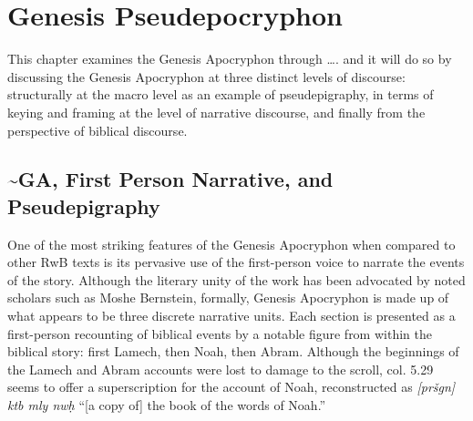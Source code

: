 \hypertarget{genesis-pseudepocryphon}{%
\chapter{Genesis Pseudepocryphon}\label{genesis-pseudepocryphon}}

This chapter examines the Genesis Apocryphon through \ldots{}. and it
will do so by discussing the Genesis Apocryphon at three distinct levels
of discourse: structurally at the macro level as an example of
pseudepigraphy, in terms of keying and framing at the level of narrative
discourse, and finally from the perspective of biblical discourse.

\hypertarget{ga-first-person-narrative-and-psy}{%
\section{\textasciitilde{}GA, First Person Narrative, and
Pseudepigraphy}\label{ga-first-person-narrative-and-psy}}

One of the most striking features of the Genesis Apocryphon when
compared to other RwB texts is its pervasive use of the first-person
voice to narrate the events of the story. Although the literary unity of
the work has been advocated by noted scholars such as Moshe Bernstein,
formally, Genesis Apocryphon is made up of what appears to be three
discrete narrative units.\autocite{bernstein_jbl2009} Each section is
presented as a first-person recounting of biblical events by a notable
figure from within the biblical story: first Lamech, then Noah, then
Abram. Although the beginnings of the Lamech and Abram accounts were
lost to damage to the scroll, col. 5.29 seems to offer a superscription
for the account of Noah, reconstructed as \emph{{[}pršgn{]} ktb mly nwḥ}
``{[}a copy of{]} the book of the words of Noah.''

